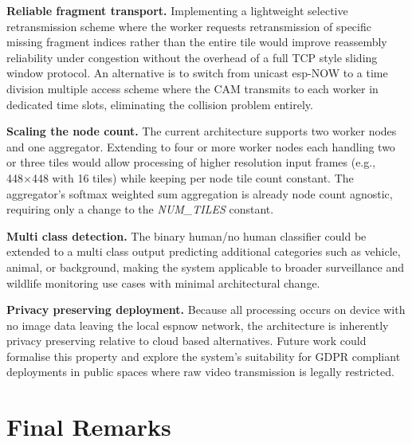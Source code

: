 \textbf{Reliable fragment transport.} Implementing a lightweight selective
retransmission scheme where the worker requests retransmission of specific missing
fragment indices rather than the entire tile would improve reassembly reliability under
congestion without the overhead of a full TCP style sliding window protocol. An
alternative is to switch from unicast \gls{esp}-NOW to a time division multiple access
scheme where the CAM transmits to each worker in dedicated time slots, eliminating the
collision problem entirely.
 
\textbf{Scaling the node count.} The current architecture supports two worker nodes and
one aggregator. Extending to four or more worker nodes each handling two or three
tiles would allow processing of higher resolution input frames (e.g., 448×448 with 16
tiles) while keeping per node tile count constant. The aggregator's softmax weighted sum
aggregation is already node count agnostic, requiring only a change to the
\textit{NUM\_TILES} constant.
 
\textbf{Multi class detection.} The binary human/no human classifier could be extended
to a multi class output predicting additional categories such as vehicle, animal, or
background, making the system applicable to broader surveillance and wildlife monitoring
use cases with minimal architectural change.
 
\textbf{Privacy preserving deployment.} Because all processing occurs on device with no
image data leaving the local \gls{espnow} network, the architecture is inherently
privacy preserving relative to cloud based alternatives. Future work could formalise
this property and explore the system's suitability for GDPR compliant deployments in
public spaces where raw video transmission is legally restricted.
 
\section{Final Remarks}
 
